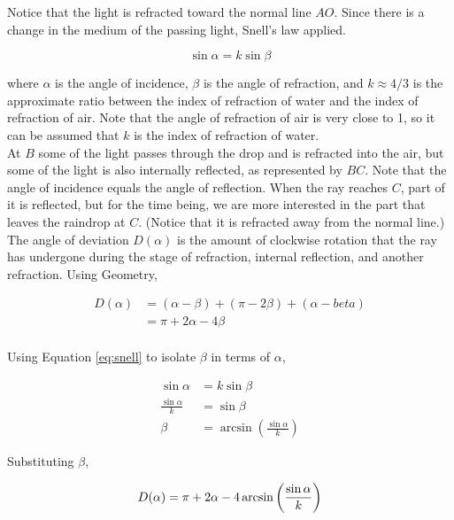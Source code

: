 \documentclass[a4paper,12pt]{article}
\begin{document}
Notice that the light is refracted toward the normal line $AO$. Since there is a change in the medium of the passing light, Snell’s law applied. \

\begin{equation} \label{eq:snell}
\sin \alpha = k \sin \beta
\end{equation}

where $\alpha$ is the angle of incidence, $\beta$ is the angle of refraction, and $k \approx 4/3$ is the approximate ratio between the index of refraction of water and the index of refraction of air. Note that the angle of refraction of air is very close to 1, so it can be assumed that $k$ is the index of refraction of water.\\

At $B$ some of the light passes through the drop and is refracted into the air, but some of the light is also internally reflected, as represented by $BC$. Note that the angle of incidence equals the angle of reflection. When the ray reaches $C$, part of it is reflected, but for the time being, we are more interested in the part that leaves the raindrop at $C$. (Notice that it is refracted away from the normal line.) \\

The angle of deviation $D(\alpha)$ is the amount of clockwise rotation that the ray has undergone during the stage of refraction, internal reflection, and another refraction. Using Geometry, 

\begin{align*}
D(\alpha) &= (\alpha - \beta) + (\pi - 2\beta) +(\alpha - beta) \\
&= \pi + 2\alpha - 4\beta\\
\end{align*}

Using Equation \ref{eq:snell} to isolate $\beta$ in terms of $\alpha$,

\begin{align*}
\sin \alpha &= k \sin \beta\\
\frac{\sin \alpha}{k} &= \sin \beta\\
\beta &= \arcsin \left(\frac{\sin \alpha}{k} \right)
\end{align*}

Substituting $\beta$,

\begin{equation}\notag
D(\alpha) = \pi + 2\alpha - 4\arcsin \left( \frac{\sin \alpha}{k} \right)
\end{equation}
\end{document}
